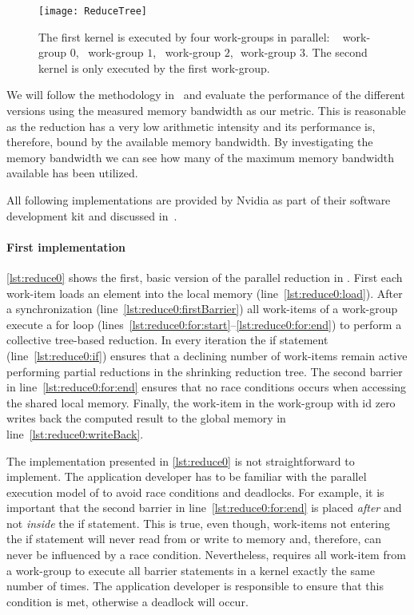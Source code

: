 \begin{figure}[t]
  \centering
  \texttt{[image: ReduceTree]}
  \caption{The first \OpenCL kernel is executed by four work-groups in parallel:
    \ \protect\firstBox{}\,\,work-group $0$,\ \protect\secondBox{}\,\,work-group $1$,\ \protect\thirdBox{}\,\,work-group $2$, \protect\fourthBox{}\,\,work-group $3$.
           The second \OpenCL kernel is only executed by the first work-group.}
  \label{fig:reduce:tree}
\end{figure}

We will follow the methodology in~\cite{Harris2007} and evaluate the performance of the different versions using the measured memory bandwidth as our metric.
This is reasonable as the reduction has a very low arithmetic intensity and its performance is, therefore, bound by the available memory bandwidth.
By investigating the memory bandwidth we can see how many of the maximum memory bandwidth available has been utilized.

All following implementations are provided by Nvidia as part of their software development kit and discussed in~\cite{Harris2007}.

\paragraph{First \OpenCL implementation}
\autoref{lst:reduce0} shows the first, basic version of the parallel reduction in \OpenCL.
First each work-item loads an element into the local memory (line~\ref{lst:reduce0:load}).
After a synchronization (line~\ref{lst:reduce0:firstBarrier}) all work-items of a work-group execute a for loop (lines~\ref{lst:reduce0:for:start}--\ref{lst:reduce0:for:end}) to perform a collective tree-based reduction.
In every iteration the if statement (line~\ref{lst:reduce0:if}) ensures that a declining number of work-items remain active performing partial reductions in the shrinking reduction tree.
The second barrier in line~\ref{lst:reduce0:for:end} ensures that no race conditions occurs when accessing the shared local memory.
Finally, the work-item in the work-group with id zero writes back the computed result to the global memory in line~\ref{lst:reduce0:writeBack}.

The implementation presented in \autoref{lst:reduce0} is not straightforward to implement.
The application developer has to be familiar with the parallel execution model of \OpenCL to avoid race conditions and deadlocks.
For example, it is important that the second barrier in line~\ref{lst:reduce0:for:end} is placed \emph{after} and not \emph{inside} the if statement.
This is true, even though, work-items not entering the if statement will never read from or write to memory and, therefore, can never be influenced by a race condition.
Nevertheless, \OpenCL requires all work-item from a work-group to execute all barrier statements in a kernel exactly the same number of times.
The application developer is responsible to ensure that this condition is met, otherwise a deadlock will occur.

